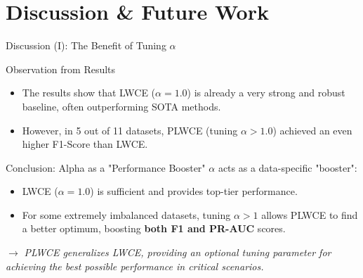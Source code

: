 \documentclass[aspectratio=169]{beamer}
\def \bblock{\begin{beamerboxesrounded}[upper=uppercolor,lower=lowercolor,shadow=true]}
\def \eblock{\end{beamerboxesrounded}}
\begin{document}
\section{Discussion \& Future Work}

\begin{frame}{Discussion (I): The Benefit of Tuning $\alpha$}

\vspace{0.02\textwidth}
\begin{block}{Observation from Results}
    \begin{itemize}
        \item The results show that LWCE ($\alpha=1.0$) is already a very strong and robust baseline, often outperforming SOTA methods.
        \item However, in 5 out of 11 datasets, PLWCE (tuning $\alpha > 1.0$) achieved an even higher F1-Score than LWCE.
    \end{itemize}
\end{block}

\vspace{-0.01\textwidth}
\bblock{Conclusion: Alpha as a "Performance Booster"}
    $\alpha$ acts as a data-specific "booster":
    \begin{itemize}
        \item LWCE ($\alpha=1.0$) is sufficient and provides top-tier performance.
        \item For some \alert{extremely imbalanced} datasets, tuning $\alpha > 1$ allows PLWCE to find a better optimum, boosting \textbf{both F1 and PR-AUC} scores.
    \end{itemize}
    \vfill
    $\to$ \textit{PLWCE generalizes LWCE, providing an optional tuning parameter for achieving the best possible performance in critical scenarios.}
\eblock

\end{frame}
\end{document}
